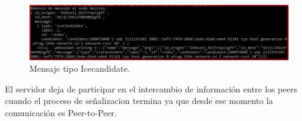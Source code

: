 \begin{figure}[!h]
\begin{center}
   \includegraphics[width=0.8\linewidth]{Figures/IceCandidateVideos}
	\decoRule
	\caption[Request/Replay conexión Servidor]{Mensaje tipo Icecandidate.}
\label{fig:EjecucionStablishConnection}
\end{center}
\end{figure}
El servidor deja de participar en el intercambio de información entre los peers cuando el proceso de señalizacion termina ya que desde ese momento la comunicación es Peer-to-Peer.


